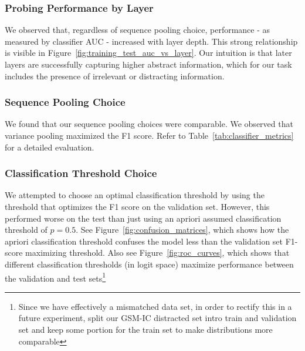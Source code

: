 \documentclass{article}
\begin{document}

\subsubsection{Probing Performance by Layer}
We observed that, regardless of sequence pooling choice, performance - as measured by classifier AUC - increased with layer depth. This strong relationship is visible in Figure~\ref{fig:training_test_auc_vs_layer}. Our intuition is that later layers are successfully capturing higher abstract information, which for our task includes the presence of irrelevant or distracting information.

\subsubsection{Sequence Pooling Choice}
We found that our sequence pooling choices were comparable. We observed that variance pooling maximized the F1 score. Refer to Table~\ref{tab:classifier_metrics} for a detailed evaluation. 

\subsubsection{Classification Threshold Choice}
We attempted to choose an optimal classification threshold by using the threshold that optimizes the F1 score on the validation set. However, this performed worse on the test than just using an apriori assumed classification threshold of $p=0.5$. See Figure~\ref{fig:confusion_matrices}, which shows how the apriori classification threshold confuses the model less than the validation set F1-score maximizing threshold. Also see Figure~\ref{fig:roc_curves}, which shows that different classification thresholds (in logit space) maximize performance between the validation and test sets\footnote{Since we have effectively a mismatched data set, in order to rectify this in a future experiment, split our GSM-IC distracted set intro train and validation set and keep some portion for the train set to make distributions more comparable}
\end{document}
